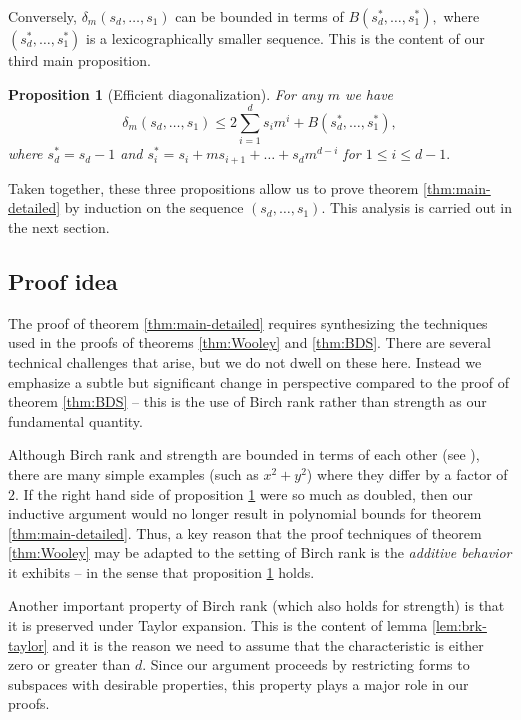 \documentclass[12pt]{amsart}
\newtheorem{proposition}[theorem]{Proposition}
\theoremstyle{definition}
\begin{document}
Conversely, $\delta_m(s_d,\ldots,s_1)$ can be bounded in terms of $B(s_d^*,\ldots,s_1^*),$ where $(s_d^*,\ldots,s_1^*)$ is a lexicographically smaller sequence. This is the content of our third main proposition.

\begin{proposition}[Efficient diagonalization]\label{prop:diag}
    For any $m$ we have 
    \[
    \delta_m(s_d,\ldots,s_1) \le 2\sum_{i=1}^d s_im^i+B(s^*_d,\ldots,s^*_1),
    \]
    where $s^*_d = s_d-1$ and $s^*_i = s_i+ms_{i+1}+\ldots+s_dm^{d-i}$ for $1\le i\le d-1.$ 
\end{proposition}



Taken together, these three propositions allow us to prove theorem \ref{thm:main-detailed} by induction on the sequence $(s_d,\ldots,s_1).$ This analysis is carried out in the next section.



\subsection{Proof idea} The proof of theorem \ref{thm:main-detailed} requires synthesizing the techniques used in the proofs of theorems \ref{thm:Wooley} and \ref{thm:BDS}. There are several technical challenges that arise, but we do not dwell on these here. Instead we emphasize a subtle but significant change in perspective compared to the proof of theorem \ref{thm:BDS} -- this is the use of Birch rank rather than strength as our fundamental quantity. 

Although Birch rank and strength are bounded in terms of each other (see \cite{BDS-strength}), there are many simple examples (such as $x^2+y^2$) where they differ by a factor of $2.$ If the right hand side of proposition \ref{prop:diag} were so much as doubled, then our inductive argument would no longer result in polynomial bounds for theorem \ref{thm:main-detailed}. Thus, a key reason that the proof techniques of theorem \ref{thm:Wooley} may be adapted to the setting of Birch rank is the \emph{additive behavior} it exhibits -- in the sense that proposition \ref{prop:diag} holds. 
  
Another important property of Birch rank (which also holds for strength)  is that it is preserved under Taylor expansion. This is the content of lemma \ref{lem:brk-taylor} and it is the reason we need to assume that the characteristic is either zero or greater than $d.$ Since our argument proceeds by restricting forms to subspaces with desirable properties, this property plays a major role in our proofs.
\end{document}
